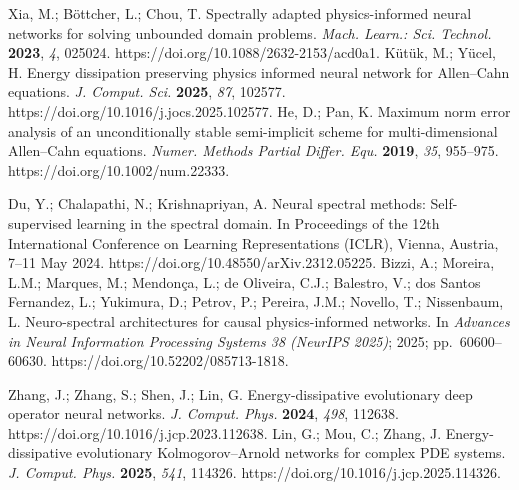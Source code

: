
 Xia, M.; B\"ottcher, L.; Chou, T. Spectrally adapted physics-informed neural networks for solving unbounded domain problems. \textit{Mach. Learn.: Sci. Technol.} \textbf{2023}, \textit{4}, 025024. https://doi.org/10.1088/2632-2153/acd0a1.
 K\"ut\"uk, M.; Y\"ucel, H. Energy dissipation preserving physics informed neural network for Allen--Cahn equations. \textit{J. Comput. Sci.} \textbf{2025}, \textit{87}, 102577. https://doi.org/10.1016/j.jocs.2025.102577.
 He, D.; Pan, K. Maximum norm error analysis of an unconditionally stable semi-implicit scheme for multi-dimensional Allen--Cahn equations. \textit{Numer. Methods Partial Differ. Equ.} \textbf{2019}, \textit{35}, 955--975. https://doi.org/10.1002/num.22333.

 Du, Y.; Chalapathi, N.; Krishnapriyan, A. Neural spectral methods: Self-supervised learning in the spectral domain. In Proceedings of the 12th International Conference on Learning Representations (ICLR), Vienna, Austria, 7--11 May 2024. https://doi.org/10.48550/arXiv.2312.05225.
 Bizzi, A.; Moreira, L.M.; Marques, M.; Mendon\c{c}a, L.; de Oliveira, C.J.; Balestro, V.; dos Santos Fernandez, L.; Yukimura, D.; Petrov, P.; Pereira, J.M.; Novello, T.; Nissenbaum, L. Neuro-spectral architectures for causal physics-informed networks. In \textit{Advances in Neural Information Processing Systems 38 (NeurIPS 2025)}; 2025; pp.\ 60600--60630. https://doi.org/10.52202/085713-1818.

 Zhang, J.; Zhang, S.; Shen, J.; Lin, G. Energy-dissipative evolutionary deep operator neural networks. \textit{J. Comput. Phys.} \textbf{2024}, \textit{498}, 112638. https://doi.org/10.1016/j.jcp.2023.112638.
 Lin, G.; Mou, C.; Zhang, J. Energy-dissipative evolutionary Kolmogorov--Arnold networks for complex PDE systems. \textit{J. Comput. Phys.} \textbf{2025}, \textit{541}, 114326. https://doi.org/10.1016/j.jcp.2025.114326.


